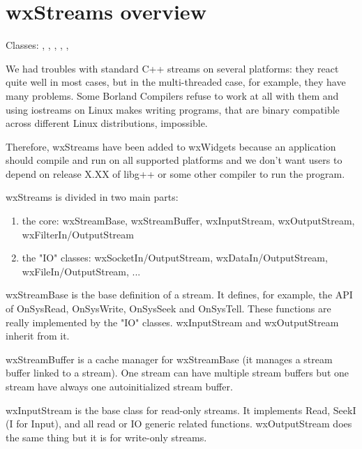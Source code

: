 \section{wxStreams overview}\label{wxstreamoverview}

Classes: ,
 , ,
 ,
 ,


We had troubles with standard C++ streams on several platforms:
they react quite well in most cases, but in the multi-threaded case, for example,
they have many problems. Some Borland Compilers refuse to work at all
with them and using iostreams on Linux makes writing programs, that are
binary compatible across different Linux distributions, impossible.

Therefore, wxStreams have been added to wxWidgets because an application should 
compile and run on all supported platforms and we don't want users to depend on release
X.XX of libg++ or some other compiler to run the program.

wxStreams is divided in two main parts:

\begin{enumerate}\itemsep=0pt
\item the core: wxStreamBase, wxStreamBuffer, wxInputStream, wxOutputStream,
wxFilterIn/OutputStream
\item the "IO" classes: wxSocketIn/OutputStream, wxDataIn/OutputStream, wxFileIn/OutputStream, ...
\end{enumerate}

wxStreamBase is the base definition of a stream. It defines, for example,
the API of OnSysRead, OnSysWrite, OnSysSeek and OnSysTell. These functions 
are really implemented by the "IO" classes.
wxInputStream and wxOutputStream inherit from it.

wxStreamBuffer is a cache manager for wxStreamBase (it manages a stream buffer
linked to a stream). One stream can have multiple stream buffers  but one stream
have always one autoinitialized stream buffer.

wxInputStream is the base class for read-only streams. It implements Read,
SeekI (I for Input), and all read or IO generic related functions.
wxOutputStream does the same thing but it is for write-only streams.

